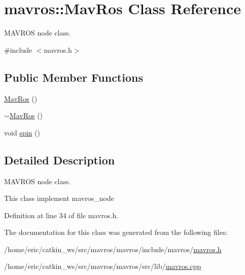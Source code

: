 \hypertarget{classmavros_1_1MavRos}{}\section{mavros\+::Mav\+Ros Class Reference}
\label{classmavros_1_1MavRos}


M\+A\+V\+R\+OS node class.  




{\ttfamily \#include $<$mavros.\+h$>$}

\subsection*{Public Member Functions}
\begin{DoxyCompactItemize}
\item 
\mbox{\hyperlink{group__nodelib_gaa8188d2a9ae2324e2a91f2ec12077715}{Mav\+Ros}} ()
\item 
\mbox{\hyperlink{group__nodelib_ga34b0d289748daac51cfc675e50def27c}{$\sim$\+Mav\+Ros}} ()
\item 
void \mbox{\hyperlink{group__nodelib_ga0ab105c6877addaf2149bac6371746e0}{spin}} ()
\end{DoxyCompactItemize}


\subsection{Detailed Description}
M\+A\+V\+R\+OS node class. 

This class implement mavros\+\_\+node 

Definition at line 34 of file mavros.\+h.



The documentation for this class was generated from the following files\+:\begin{DoxyCompactItemize}
\item 
/home/eric/catkin\+\_\+ws/src/mavros/mavros/include/mavros/\mbox{\hyperlink{mavros_8h}{mavros.\+h}}\item 
/home/eric/catkin\+\_\+ws/src/mavros/mavros/src/lib/\mbox{\hyperlink{mavros_8cpp}{mavros.\+cpp}}\end{DoxyCompactItemize}
